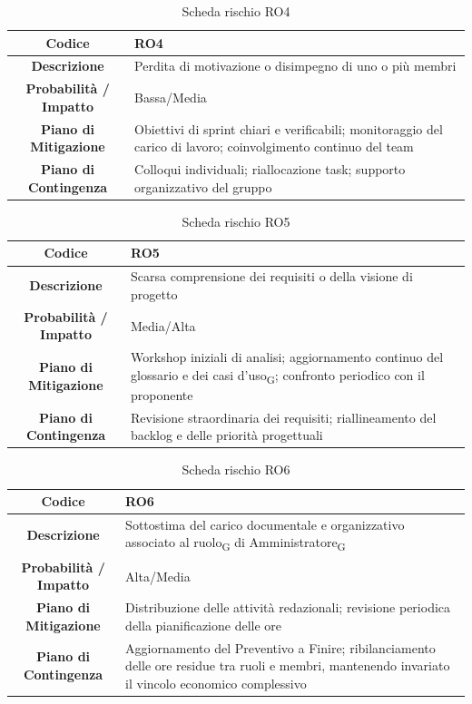\begin{table}[H]
	\centering
	\renewcommand{\arraystretch}{1.3}
	\begin{tabularx}{\textwidth}{|c|X|}
		\hline
		\textbf{Codice} & \textbf{RO4} \\
		\hline
		\textbf{Descrizione} & Perdita di motivazione o disimpegno di uno o più membri \\
		\hline
		\textbf{Probabilità / Impatto} & Bassa/Media \\
		\hline
		\textbf{Piano di Mitigazione} & Obiettivi di sprint chiari e verificabili; monitoraggio del carico di lavoro; coinvolgimento continuo del team \\
		\hline
		\textbf{Piano di Contingenza} & Colloqui individuali; riallocazione task; supporto organizzativo del gruppo \\
		\hline
	\end{tabularx}
	\caption{Scheda rischio RO4}
\end{table}

\begin{table}[H]
	\centering
	\renewcommand{\arraystretch}{1.3}
	\begin{tabularx}{\textwidth}{|c|X|}
		\hline
		\textbf{Codice} & \textbf{RO5} \\
		\hline
		\textbf{Descrizione} & Scarsa comprensione dei requisiti o della visione di progetto \\
		\hline
		\textbf{Probabilità / Impatto} & Media/Alta \\
		\hline
		\textbf{Piano di Mitigazione} & Workshop iniziali di analisi; aggiornamento continuo del glossario e dei casi d'uso\textsubscript{G}; confronto periodico con il proponente \\
		\hline
		\textbf{Piano di Contingenza} & Revisione straordinaria dei requisiti; riallineamento del backlog e delle priorità progettuali \\
		\hline
	\end{tabularx}
	\caption{Scheda rischio RO5}
\end{table}

\begin{table}[H]
	\centering
	\renewcommand{\arraystretch}{1.3}
	\begin{tabularx}{\textwidth}{|c|X|}
		\hline
		\textbf{Codice} & \textbf{RO6} \\
		\hline
		\textbf{Descrizione} & Sottostima del carico documentale e organizzativo associato al ruolo\textsubscript{G} di Amministratore\textsubscript{G} \\
		\hline
		\textbf{Probabilità / Impatto} & Alta/Media \\
		\hline
		\textbf{Piano di Mitigazione} & Distribuzione delle attività redazionali; revisione periodica della pianificazione delle ore \\
		\hline
		\textbf{Piano di Contingenza} & Aggiornamento del Preventivo a Finire; ribilanciamento delle ore residue tra ruoli e membri, mantenendo invariato il vincolo economico complessivo \\
		\hline
	\end{tabularx}
	\caption{Scheda rischio RO6}
\end{table}

